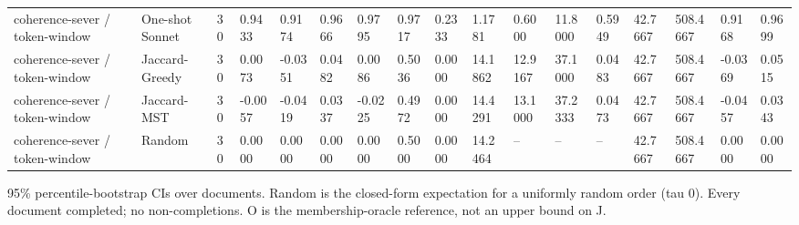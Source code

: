 \begin{table}[t]
{\begin{tabular}{lllllllllllllllll}
coherence-sever / token-window & One-shot Sonnet & 30 & 0.9433 & 0.9174 & 0.9666 & 0.9795 & 0.9717 & 0.2333 & 1.1781 & 0.6000 & 11.8000 & 0.5949 & 42.7667 & 508.4667 & 0.9168 & 0.9699 \\
coherence-sever / token-window & Jaccard-Greedy & 30 & 0.0073 & -0.0351 & 0.0482 & 0.0086 & 0.5036 & 0.0000 & 14.1862 & 12.9167 & 37.1000 & 0.0483 & 42.7667 & 508.4667 & -0.0369 & 0.0515 \\
coherence-sever / token-window & Jaccard-MST & 30 & -0.0057 & -0.0419 & 0.0337 & -0.0225 & 0.4972 & 0.0000 & 14.4291 & 13.1000 & 37.2333 & 0.0473 & 42.7667 & 508.4667 & -0.0457 & 0.0343 \\
coherence-sever / token-window & Random & 30 & 0.0000 & 0.0000 & 0.0000 & 0.0000 & 0.5000 & 0.0000 & 14.2464 & -- & -- & -- & 42.7667 & 508.4667 & 0.0000 & 0.0000 \\
\bottomrule
\end{tabular}}
\par\smallskip\parbox{\linewidth}{\tiny 95\% percentile-bootstrap CIs over documents. Random is the closed-form expectation for a uniformly random order (tau 0). Every document completed; no non-completions. O is the membership-oracle reference, not an upper bound on J.}
\end{table}

